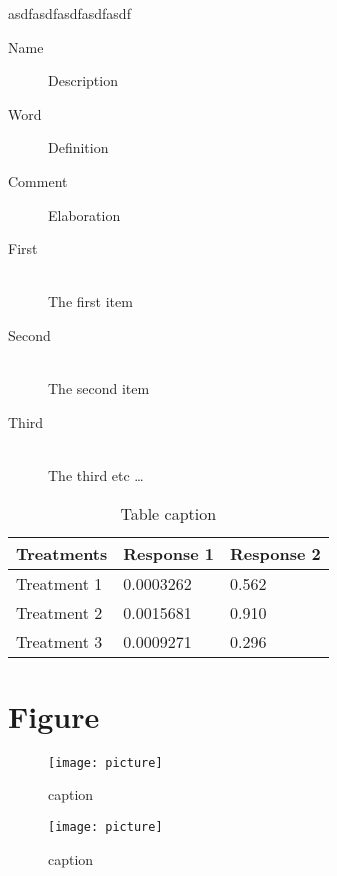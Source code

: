 \begin{corollary}
asdfasdfasdfasdfasdf
\end{corollary}

\begin{description}
\item[Name] Description
\item[Word] Definition
\item[Comment] Elaboration
\end{description}


\begin{description}
  \item[First] \hfill \\
  The first item
  \item[Second] \hfill \\
  The second item
  \item[Third] \hfill \\
  The third etc \ldots
\end{description}

\begin{table}[h]
\centering
\begin{tabular}{l l l}
\toprule
\textbf{Treatments} & \textbf{Response 1} & \textbf{Response 2}\\
\midrule
Treatment 1 & 0.0003262 & 0.562 \\
Treatment 2 & 0.0015681 & 0.910 \\
Treatment 3 & 0.0009271 & 0.296 \\
\bottomrule
\end{tabular}
\caption{Table caption}
\end{table}


\section{Figure}

\begin{figure}[h]
\centering
\texttt{[image: picture]}
\caption{caption}
\end{figure}

\begin{figure}[h]
\centering
\texttt{[image: picture]}
\caption{caption}
\end{figure}



\vspace{\baselineskip}

